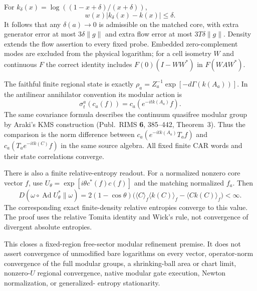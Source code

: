 For $k_\delta(x)=\log((1-x+\delta)/(x+\delta))$,
\[
 w(x)|k_\delta(x)-k(x)|\leq\delta.
\]
It follows that any $\delta(a)\to0$ is admissible on the matched core,
with extra generator error at most $3\delta\|g\|$ and extra flow error
at most $3T\delta\|g\|$. Density extends the flow assertion to every
fixed probe. Embedded zero-complement modes are excluded from the
physical logarithm; for a cell isometry $W$ and continuous $F$ the correct
identity includes $F(0)(I-WW^*)$ in $F(WAW^*)$.

The faithful finite regional state is exactly
$\rho_a=Z_a^{-1}\exp[-d\Gamma(k(A_a))]$. In the antilinear annihilator
convention its modular action is
\[
 \sigma_t^a(c_a(f))=c_a(e^{-itk(A_a)}f).
\]
The same covariance formula describes the continuum quasifree modular
group by Araki's KMS construction (Publ.~RIMS \textbf{6}, 385--442,
Theorem~3). Thus the comparison is the norm difference between
$c_a(e^{-itk(A_a)}T_af)$ and $c_a(T_ae^{-itk(C)}f)$ in the same source
algebra. All fixed finite CAR words and their state correlations converge.

There is also a finite relative-entropy readout. For a normalized nonzero
core vector $f$, use $U_\theta=\exp[i\theta c^*(f)c(f)]$ and the matching
normalized $f_a$. Then
\[
 D(\omega\circ\operatorname{Ad}U_\theta^*\|\omega)
 =2(1-\cos\theta)
 \bigl(\langle C\rangle_f\langle k(C)\rangle_f
                 -\langle Ck(C)\rangle_f\bigr)<\infty.
\]
The corresponding exact finite-density relative entropies converge to
this value. The proof uses the relative Tomita identity and Wick's rule,
not convergence of divergent absolute entropies.

This closes a fixed-region free-sector modular refinement premise.
It does not assert convergence of unmodified bare logarithms on every
vector, operator-norm convergence of the full modular groups, a
shrinking-ball area or chart limit, nonzero-$U$ regional convergence,
native modular gate execution, Newton normalization, or generalized-
entropy stationarity.
